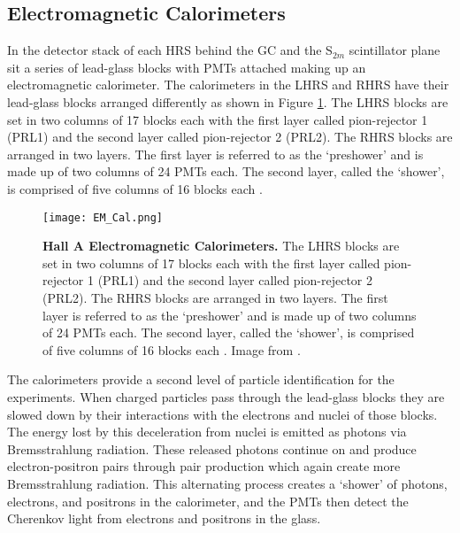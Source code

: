 \subsection{Electromagnetic Calorimeters}
\label{ssec:em_cal}

In the detector stack of each HRS behind the GC and the S$_{2m}$ scintillator plane sit a series of lead-glass blocks with PMTs attached making up an electromagnetic calorimeter. The calorimeters in the LHRS and RHRS have their lead-glass blocks arranged differently as shown in Figure \ref{fig:em_cal}. The LHRS blocks are set in two columns of 17 blocks each with the first layer called pion-rejector 1 (PRL1) and the second layer called pion-rejector 2 (PRL2). The RHRS blocks are arranged in two layers. The first layer is referred to as the `preshower' and is made up of two columns of 24 PMTs each. The second layer, called the `shower', is comprised of five columns of 16 blocks each \cite{Article:HallA} \cite{Thesis:Ye}. 

\begin{figure}[!ht]
\begin{center}
\texttt{[image: EM\_Cal.png]}
\end{center}
\caption[Hall A Electromagnetic Calorimeters]{
{\bf{Hall A Electromagnetic Calorimeters.}} The LHRS blocks are set in two columns of 17 blocks each with the first layer called pion-rejector 1 (PRL1) and the second layer called pion-rejector 2 (PRL2). The RHRS blocks are arranged in two layers. The first layer is referred to as the `preshower' and is made up of two columns of 24 PMTs each. The second layer, called the `shower', is comprised of five columns of 16 blocks each \cite{Article:HallA} \cite{Thesis:Ye}. Image from \cite{Article:HallA}.}
\label{fig:em_cal}
\end{figure}

The calorimeters provide a second level of particle identification for the experiments. When charged particles pass through the lead-glass blocks they are slowed down by their interactions with the electrons and nuclei of those blocks. The energy lost by this deceleration from nuclei is emitted as photons via Bremsstrahlung radiation. These released photons continue on and produce electron-positron pairs through pair production which again create more Bremsstrahlung radiation. This alternating process creates a `shower' of photons, electrons, and positrons in the calorimeter, and the PMTs then detect the Cherenkov light from electrons and positrons in the glass. 

